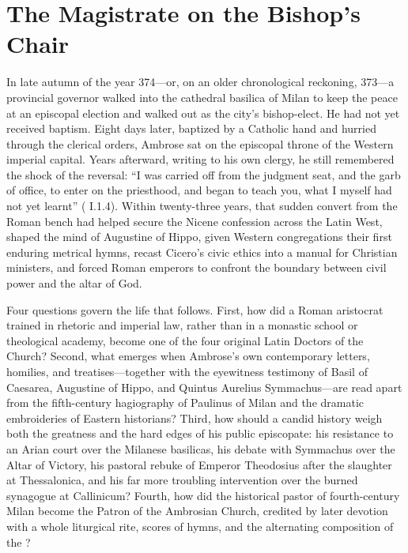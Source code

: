 \section{The Magistrate on the Bishop's Chair}

In late autumn of the year 374---or, on an older chronological reckoning, 373---a provincial governor walked into the cathedral basilica of Milan to keep the peace at an episcopal election and walked out as the city's bishop-elect. He had not yet received baptism. Eight days later, baptized by a Catholic hand and hurried through the clerical orders, Ambrose sat on the episcopal throne of the Western imperial capital. Years afterward, writing to his own clergy, he still remembered the shock of the reversal: ``I was carried off from the judgment seat, and the garb of office, to enter on the priesthood, and began to teach you, what I myself had not yet learnt'' ( I.1.4). Within twenty-three years, that sudden convert from the Roman bench had helped secure the Nicene confession across the Latin West, shaped the mind of Augustine of Hippo, given Western congregations their first enduring metrical hymns, recast Cicero's civic ethics into a manual for Christian ministers, and forced Roman emperors to confront the boundary between civil power and the altar of God.

Four questions govern the life that follows. First, how did a Roman aristocrat trained in rhetoric and imperial law, rather than in a monastic school or theological academy, become one of the four original Latin Doctors of the Church? Second, what emerges when Ambrose's own contemporary letters, homilies, and treatises---together with the eyewitness testimony of Basil of Caesarea, Augustine of Hippo, and Quintus Aurelius Symmachus---are read apart from the fifth-century hagiography of Paulinus of Milan and the dramatic embroideries of Eastern historians? Third, how should a candid history weigh both the greatness and the hard edges of his public episcopate: his resistance to an Arian court over the Milanese basilicas, his debate with Symmachus over the Altar of Victory, his pastoral rebuke of Emperor Theodosius after the slaughter at Thessalonica, and his far more troubling intervention over the burned synagogue at Callinicum? Fourth, how did the historical pastor of fourth-century Milan become the Patron of the Ambrosian Church, credited by later devotion with a whole liturgical rite, scores of hymns, and the alternating composition of the ?

